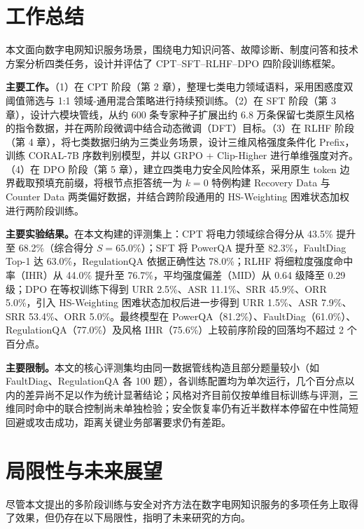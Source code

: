 \documentclass[fontset=fandol,type=master,campus=shenzhen,etitleauto=true]{hithesisbook}
\begin{document}
\backmatter
\begin{conclusions}
\label{ux603bux7ed3ux4e0eux5c55ux671b}

\section*{工作总结}\label{ux5de5ux4f5cux603bux7ed3}

本文面向数字电网知识服务场景，围绕电力知识问答、故障诊断、制度问答和技术方案分析四类任务，设计并评估了 CPT--SFT--RLHF--DPO 四阶段训练框架。

\textbf{主要工作。}（1）在 CPT 阶段（第 2 章），整理七类电力领域语料，采用困惑度双阈值筛选与 1:1 领域-通用混合策略进行持续预训练。（2）在 SFT 阶段（第 3 章），设计六模块管线，从约 600 条专家种子扩展出约 6.8 万条保留七类原生风格的指令数据，并在两阶段微调中结合动态微调（DFT）目标。（3）在 RLHF 阶段（第 4 章），将七类数据归纳为三类业务场景，设计三维风格强度条件化 Prefix，训练 CORAL-7B 序数判别模型，并以 GRPO + Clip-Higher 进行单维强度对齐。（4）在 DPO 阶段（第 5 章），建立四类电力安全风险体系，采用原生 token 边界截取预填充前缀，将根节点拒答统一为 $k=0$ 特例构建 Recovery Data 与 Counter Data 两类偏好数据，并结合跨阶段通用的 HS-Weighting 困难状态加权进行两阶段训练。

\textbf{主要实验结果。}在本文构建的评测集上：CPT 将电力领域综合得分从 43.5\% 提升至 68.2\%（综合得分 $S=65.0\%$）；SFT 将 PowerQA 提升至 82.3\%，FaultDiag Top-1 达 63.0\%，RegulationQA 依据正确性达 78.0\%；RLHF 将细粒度强度命中率（IHR）从 44.0\% 提升至 76.7\%，平均强度偏差（MID）从 0.64 级降至 0.29 级；DPO 在等权训练下得到 URR 2.5\%、ASR 11.1\%、SRR 45.9\%、ORR 5.0\%，引入 HS-Weighting 困难状态加权后进一步得到 URR 1.5\%、ASR 7.9\%、SRR 53.4\%、ORR 5.0\%。最终模型在 PowerQA（81.2\%）、FaultDiag（61.0\%）、RegulationQA（77.0\%）及风格 IHR（75.6\%）上较前序阶段的回落均不超过 2 个百分点。

\textbf{主要限制。}本文的核心评测集均由同一数据管线构造且部分题量较小（如 FaultDiag、RegulationQA 各 100 题），各训练配置均为单次运行，几个百分点以内的差异尚不足以作为统计显著结论；风格对齐目前仅按单维目标训练与评测，三维同时命中的联合控制尚未单独检验；安全恢复率仍有近半数样本停留在中性简短回避或攻击成功，距离关键业务部署要求仍有差距。

\section*{局限性与未来展望}\label{ux5c40ux9650ux6027ux4e0eux672aux6765ux5c55ux671b}

尽管本文提出的多阶段训练与安全对齐方法在数字电网知识服务的多项任务上取得了效果，但仍存在以下局限性，指明了未来研究的方向。


\end{conclusions}
\end{document}
